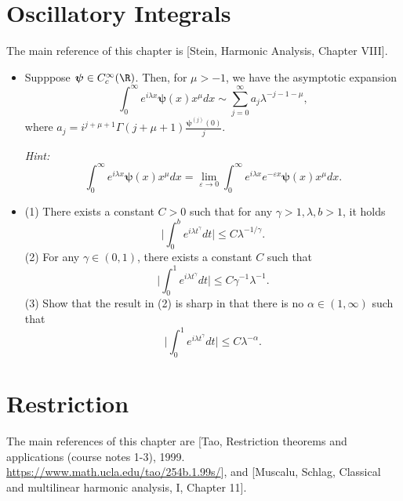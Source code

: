 \section{Oscillatory Integrals}
The main reference of this chapter is [Stein, Harmonic Analysis, Chapter VIII].
\begin{itemize}
    \item[1.] Supppose $\boldsymbol{\psi}\in C_c^\infty(\R)$. 
    Then, for $\mu>-1$, we have the asymptotic expansion
    $$\int_0^\infty e^{i\lambda x}\boldsymbol{\psi}(x)x^\mu dx
    \sim\sum_{j=0}^\infty a_j\lambda^{-j-1-\mu},$$
    where $a_j=i^{j+\mu+1}\Gamma(j+\mu+1)\frac{\boldsymbol{\psi}^{(j)}(0)}{j}$.

    \textit{Hint:}
    $$\int_0^\infty e^{i\lambda x}\boldsymbol{\psi}(x)x^\mu dx
    =\lim_{\varepsilon\to0}\int_0^\infty 
    e^{i\lambda x}e^{-\varepsilon x}\boldsymbol{\psi}(x)x^\mu dx.$$

    \item[2.](1) There exists a constant $C>0$ such that 
    for any $\gamma>1,\lambda,b>1$, it holds
    $$\bigg|\int_0^b e^{i\lambda t^\gamma}dt\bigg|\le C\lambda^{-1/\gamma}.$$
    (2) For any $\gamma\in(0,1)$, there exists a constant $C$ such that
    $$\bigg|\int_0^1 e^{i\lambda t^\gamma}dt\bigg|\le C\gamma^{-1}\lambda^{-1}.$$
    (3) Show that the result in (2) is sharp in that 
    there is no $\alpha\in(1,\infty)$ such that
    $$\bigg|\int_0^1 e^{i\lambda t^\gamma}dt\bigg|\le C\lambda^{-\alpha}.$$
    
\end{itemize}
\section{Restriction}
The main references of this chapter are [Tao, Restriction theorems and applications
 (course notes 1-3), 1999. \url{https://www.math.ucla.edu/tao/254b.1.99s/}], and
[Muscalu, Schlag, Classical and multilinear harmonic analysis, I, Chapter 11].
